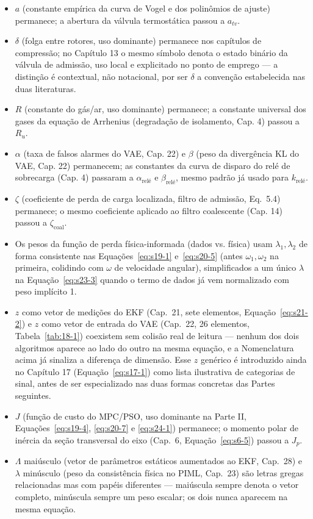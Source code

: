 \documentclass[12pt,a4paper]{article}
\numberwithin{equation}{section}
\numberwithin{table}{section}
\numberwithin{figure}{section}
\begin{document}
\begin{itemize}
	\item $a$ (constante empírica da curva de Vogel e dos polinômios de ajuste) permanece; a abertura da válvula termostática passou a $a_{tv}$.
	\item $\delta$ (folga entre rotores, uso dominante) permanece nos capítulos de compressão; no Capítulo 13 o mesmo símbolo denota o estado binário da válvula de admissão, uso local e explicitado no ponto de emprego — a distinção é contextual, não notacional, por ser $\delta$ a convenção estabelecida nas duas literaturas.
	\item $R$ (constante do gás/ar, uso dominante) permanece; a constante universal dos gases da equação de Arrhenius (degradação de isolamento, Cap. 4) passou a $R_u$.
	\item $\alpha$ (taxa de falsos alarmes do VAE, Cap. 22) e $\beta$ (peso da divergência KL do VAE, Cap. 22) permanecem; as constantes da curva de disparo do relé de sobrecarga (Cap. 4) passaram a $\alpha_{\text{relé}}$ e $\beta_{\text{relé}}$, mesmo padrão já usado para $k_{\text{relé}}$.
	\item $\zeta$ (coeficiente de perda de carga localizada, filtro de admissão, Eq.~5.4) permanece; o mesmo coeficiente aplicado ao filtro coalescente (Cap. 14) passou a $\zeta_{\text{coal}}$.
	\item Os pesos da função de perda física-informada (dados vs. física) usam $\lambda_1, \lambda_2$ de forma consistente nas Equações~\eqref{eq:s19-1} e~\eqref{eq:s20-5} (antes $\omega_1,\omega_2$ na primeira, colidindo com $\omega$ de velocidade angular), simplificados a um único $\lambda$ na Equação~\eqref{eq:s23-3} quando o termo de dados já vem normalizado com peso implícito 1.
	\item $z$ como vetor de medições do EKF (Cap.~21, sete elementos, Equação~\eqref{eq:s21-2}) e $z$ como vetor de entrada do VAE (Cap.~22, 26 elementos, Tabela~\ref{tab:18-1}) coexistem sem colisão real de leitura — nenhum dos dois algoritmos aparece ao lado do outro na mesma equação, e a Nomenclatura acima já sinaliza a diferença de dimensão. Esse $z$ genérico é introduzido ainda no Capítulo 17 (Equação~\eqref{eq:s17-1}) como lista ilustrativa de categorias de sinal, antes de ser especializado nas duas formas concretas das Partes seguintes.
	\item $J$ (função de custo do MPC/PSO, uso dominante na Parte II, Equações~\eqref{eq:s19-4}, \eqref{eq:s20-7} e \eqref{eq:s24-1}) permanece; o momento polar de inércia da seção transversal do eixo (Cap.~6, Equação~\eqref{eq:s6-5}) passou a $J_p$.
	\item $\Lambda$ maiúsculo (vetor de parâmetros estáticos aumentados ao EKF, Cap.~28) e $\lambda$ minúsculo (peso da consistência física no PIML, Cap.~23) são letras gregas relacionadas mas com papéis diferentes — maiúscula sempre denota o vetor completo, minúscula sempre um peso escalar; os dois nunca aparecem na mesma equação.
\end{itemize}
\end{document}

